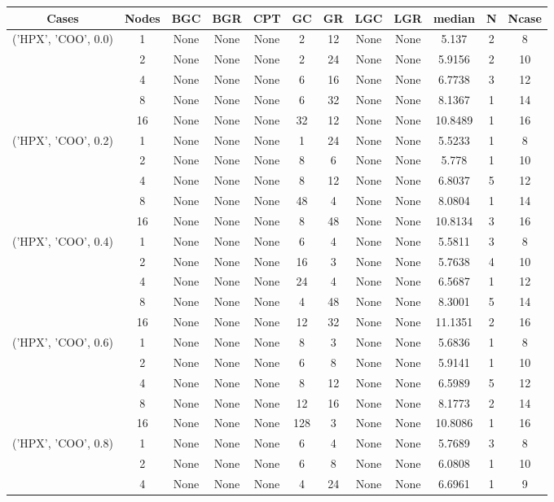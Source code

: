 \begin{tabular}{cccccccccccc}
\hline
Cases & Nodes& BGC& BGR& CPT& GC& GR& LGC& LGR& median & N & Ncase \\
\hline
\multirow{5}{*}{('HPX', 'COO', 0.0)}& 1& None& None& None& 2& 12& None& None& 5.137& 2& 8\\
& 2& None& None& None& 2& 24& None& None& 5.9156& 2& 10\\
& 4& None& None& None& 6& 16& None& None& 6.7738& 3& 12\\
& 8& None& None& None& 6& 32& None& None& 8.1367& 1& 14\\
& 16& None& None& None& 32& 12& None& None& 10.8489& 1& 16\\
\hline
\multirow{5}{*}{('HPX', 'COO', 0.2)}& 1& None& None& None& 1& 24& None& None& 5.5233& 1& 8\\
& 2& None& None& None& 8& 6& None& None& 5.778& 1& 10\\
& 4& None& None& None& 8& 12& None& None& 6.8037& 5& 12\\
& 8& None& None& None& 48& 4& None& None& 8.0804& 1& 14\\
& 16& None& None& None& 8& 48& None& None& 10.8134& 3& 16\\
\hline
\multirow{5}{*}{('HPX', 'COO', 0.4)}& 1& None& None& None& 6& 4& None& None& 5.5811& 3& 8\\
& 2& None& None& None& 16& 3& None& None& 5.7638& 4& 10\\
& 4& None& None& None& 24& 4& None& None& 6.5687& 1& 12\\
& 8& None& None& None& 4& 48& None& None& 8.3001& 5& 14\\
& 16& None& None& None& 12& 32& None& None& 11.1351& 2& 16\\
\hline
\multirow{5}{*}{('HPX', 'COO', 0.6)}& 1& None& None& None& 8& 3& None& None& 5.6836& 1& 8\\
& 2& None& None& None& 6& 8& None& None& 5.9141& 1& 10\\
& 4& None& None& None& 8& 12& None& None& 6.5989& 5& 12\\
& 8& None& None& None& 12& 16& None& None& 8.1773& 2& 14\\
& 16& None& None& None& 128& 3& None& None& 10.8086& 1& 16\\
\hline
\multirow{5}{*}{('HPX', 'COO', 0.8)}& 1& None& None& None& 6& 4& None& None& 5.7689& 3& 8\\
& 2& None& None& None& 6& 8& None& None& 6.0808& 1& 10\\
& 4& None& None& None& 4& 24& None& None& 6.6961& 1& 9\\

\end{tabular}
